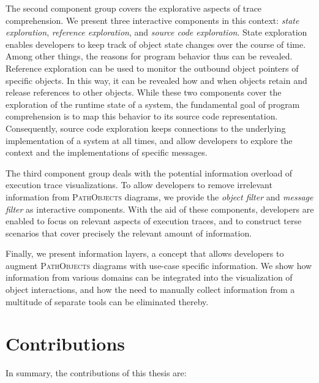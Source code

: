 The second component group covers the explorative aspects of trace comprehension.
We present three interactive components in this context: \emph{state exploration}, \emph{reference exploration}, and \emph{source code exploration}.
State exploration enables developers to keep track of object state changes over the course of time.
Among other things, the reasons for program behavior thus can be revealed.
Reference exploration can be used to monitor the outbound object pointers of specific objects.
In this way, it can be revealed how and when objects retain and release references to other objects.
While these two components cover the exploration of the runtime state of a system, the fundamental goal of program comprehension is to map this behavior to its source code representation.
Consequently, source code exploration keeps connections to the underlying implementation of a system at all times, and allow developers to explore the context and the implementations of specific messages.

The third component group deals with the potential information overload of execution trace visualizations.
To allow developers to remove irrelevant information from \textsc{PathObjects} diagrams, we provide the \emph{object filter} and \emph{message filter} as interactive components.
With the aid of these components, developers are enabled to focus on relevant aspects of execution traces, and to construct terse scenarios that cover precisely the relevant amount of information.

Finally, we present information layers, a concept that allows developers to augment \textsc{PathObjects} diagrams with use-case specific information.
We show how information from various domains can be integrated into the visualization of object interactions, and how the need to manually collect information from a multitude of separate tools can be eliminated thereby.

\section{Contributions}
In summary, the contributions of this thesis are:

